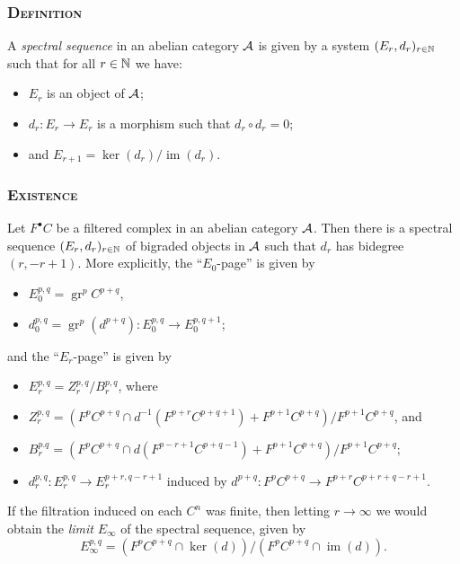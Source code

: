 \documentclass[notheorems]{beamer}
\theoremstyle{plain}
\theoremstyle{definition}
\theoremstyle{darkredexample}
\theoremstyle{remark}
\DeclareMathOperator{\gr}{gr}
\DeclareMathOperator{\im}{im}
\begin{document}
\begin{frame}
    \frametitle{\textsc{Definition} \cite[\href{https://stacks.math.columbia.edu/tag/011N}{Tag 011N}]{stacks}}
    A \textit{spectral sequence} in an abelian category $\mathcal{A}$ is given by a system $(E_{r},d_{r})_{r\in \mathbb{N}}$ such that for all $r\in \mathbb{N}$ we have:
    \pause
    \begin{itemize}
	\item $E_{r}$ is an object of $\mathcal{A}$;
	    \pause
	\item $d_{r}\colon E_{r}\to E_{r}$ is a morphism such that $d_{r}\circ d_{r}=0$;
	    \pause
	\item and $E_{r+1}=\ker(d_{r})/\im(d_{r})$.
    \end{itemize}
\end{frame}

\begin{frame}
    \frametitle{\textsc{Existence} \cite[\href{https://stacks.math.columbia.edu/tag/012M}{Tag 012M}]{stacks}}
    Let $F^{\bullet}C$ be a filtered complex in an abelian category $\mathcal{A}$.
    \pause
    Then there is a spectral sequence $(E_{r},d_{r})_{r\in \mathbb{N}}$ of bigraded objects in $\mathcal{A}$ such that $d_{r}$ has bidegree $(r,-r+1)$.
    \pause
    More explicitly, the ``$E_{0}$-page'' is given by
    \begin{itemize}
	\item $E_{0}^{p,q}=\gr^{p}C^{p+q}$,
	\item $d_{0}^{p,q}=\gr^{p}(d^{p+q})\colon E_{0}^{p,q}\to E_{0}^{p,q+1}$;
    \end{itemize}
    \pause
    and the ``$E_{r}$-page'' is given by
    \begin{itemize}
	\item $E_{r}^{p,q}=Z_{r}^{p,q}/B_{r}^{p,q}$, where
	\item $Z_{r}^{p,q}=(F^{p}C^{p+q}\cap d^{-1}(F^{p+r}C^{p+q+1})+F^{p+1}C^{p+q})/F^{p+1}C^{p+q}$, and
	\item $B_{r}^{p.q}=(F^{p}C^{p+q}\cap d(F^{p-r+1}C^{p+q-1})+F^{p+1}C^{p+q})/F^{p+1}C^{p+q}$;
	\item $d_{r}^{p,q}\colon E_{r}^{p,q}\to E_{r}^{p+r,q-r+1}$ induced by $d^{p+q}\colon F^{p}C^{p+q}\to F^{p+r}C^{p+r+q-r+1}$.
    \end{itemize}
    \pause
    
    If the filtration induced on each $C^{n}$ was finite, then letting $r\to\infty$ we would obtain the \textit{limit} $E_{\infty}$ of the spectral sequence, given by
    \[ E_{\infty}^{p,q}=(F^{p}C^{p+q}\cap \ker(d))/(F^{p}C^{p+q}\cap \im(d)). \]
\end{frame}
\end{document}
